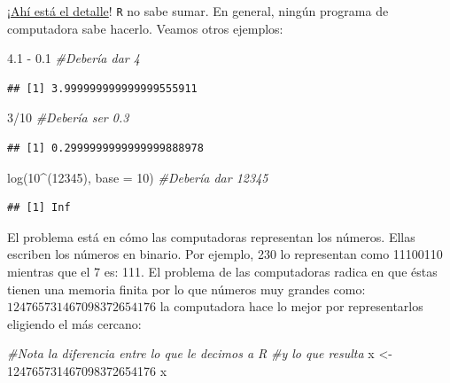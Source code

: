 \documentclass[]{tufte-book}
\newenvironment{Shaded}{}{}
\newcommand{\AttributeTok}[1]{\textcolor[rgb]{0.49,0.56,0.16}{#1}}
\newcommand{\CommentTok}[1]{\textcolor[rgb]{0.38,0.63,0.69}{\textit{#1}}}
\newcommand{\DecValTok}[1]{\textcolor[rgb]{0.25,0.63,0.44}{#1}}
\newcommand{\FloatTok}[1]{\textcolor[rgb]{0.25,0.63,0.44}{#1}}
\newcommand{\FunctionTok}[1]{\textcolor[rgb]{0.02,0.16,0.49}{#1}}
\newcommand{\NormalTok}[1]{#1}
\newcommand{\OtherTok}[1]{\textcolor[rgb]{0.00,0.44,0.13}{#1}}
\newcommand{\SpecialCharTok}[1]{\textcolor[rgb]{0.25,0.44,0.63}{#1}}
\begin{document}
¡\href{https://www.youtube.com/watch?v=1jaCpeXg-gg}{Ahí está el
detalle}! \texttt{R} no sabe sumar. En general, ningún programa de
computadora sabe hacerlo. Veamos otros ejemplos:

\begin{Shaded}
\begin{Highlighting}[]
\FloatTok{4.1} \SpecialCharTok{{-}} \FloatTok{0.1} \CommentTok{\#Debería dar 4}
\end{Highlighting}
\end{Shaded}

\begin{verbatim}
## [1] 3.999999999999999555911
\end{verbatim}

\begin{Shaded}
\begin{Highlighting}[]
\DecValTok{3}\SpecialCharTok{/}\DecValTok{10}      \CommentTok{\#Debería ser 0.3}
\end{Highlighting}
\end{Shaded}

\begin{verbatim}
## [1] 0.2999999999999999888978
\end{verbatim}

\begin{Shaded}
\begin{Highlighting}[]
\FunctionTok{log}\NormalTok{(}\DecValTok{10}\SpecialCharTok{\^{}}\NormalTok{(}\DecValTok{12345}\NormalTok{), }\AttributeTok{base =} \DecValTok{10}\NormalTok{) }\CommentTok{\#Debería dar 12345}
\end{Highlighting}
\end{Shaded}

\begin{verbatim}
## [1] Inf
\end{verbatim}

El problema está en cómo las computadoras representan los números. Ellas
escriben los números en binario. Por ejemplo, 230 lo representan como
11100110 mientras que el 7 es: 111. El problema de las computadoras
radica en que éstas tienen una memoria finita por lo que números muy
grandes como: \(124765731467098372654176\) la computadora hace lo mejor
por representarlos eligiendo el más cercano:

\begin{Shaded}
\begin{Highlighting}[]
\CommentTok{\#Nota la diferencia entre lo que le decimos a R}
\CommentTok{\#y lo que resulta}
\NormalTok{x }\OtherTok{\textless{}{-}} \DecValTok{124765731467098372654176}
\NormalTok{x}
\end{Highlighting}
\end{Shaded}
\end{document}
